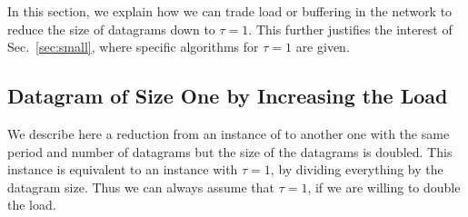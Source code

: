 In this section, we explain how we can trade load or buffering in the network to reduce the size of datagrams down to $\tau = 1$. This further justifies the interest of Sec.~\ref{sec:small}, where specific algorithms for $\tau = 1$ are given.

\subsection{Datagram of Size One by Increasing the Load}

We describe here a reduction from an instance of \pma to another one with the same period and number of datagrams but 
the size of the datagrams is doubled. This instance is equivalent to an instance with $\tau = 1$, by dividing everything by the datagram size. Thus we can always assume that $\tau = 1$, if we are willing to double the load.


